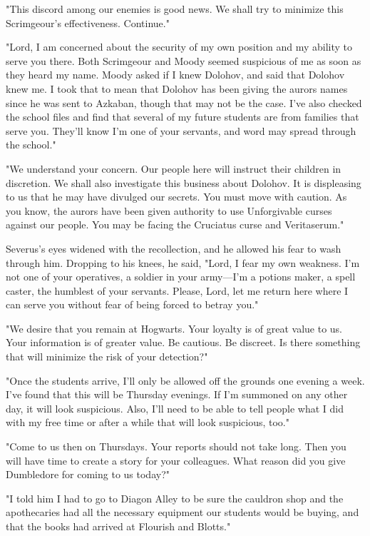 "This discord among our enemies is good news. We shall try to minimize this Scrimgeour's effectiveness. Continue."

"Lord, I am concerned about the security of my own position and my ability to serve you there. Both Scrimgeour and Moody seemed suspicious of me as soon as they heard my name. Moody asked if I knew Dolohov, and said that Dolohov knew me. I took that to mean that Dolohov has been giving the aurors names since he was sent to Azkaban, though that may not be the case. I've also checked the school files and find that several of my future students are from families that serve you. They'll know I'm one of your servants, and word may spread through the school."

"We understand your concern. Our people here will instruct their children in discretion. We shall also investigate this business about Dolohov. It is displeasing to us that he may have divulged our secrets. You must move with caution. As you know, the aurors have been given authority to use Unforgivable curses against our people. You may be facing the Cruciatus curse and Veritaserum."

Severus's eyes widened with the recollection, and he allowed his fear to wash through him. Dropping to his knees, he said, "Lord, I fear my own weakness. I'm not one of your operatives, a soldier in your army—I'm a potions maker, a spell caster, the humblest of your servants. Please, Lord, let me return here where I can serve you without fear of being forced to betray you."

"We desire that you remain at Hogwarts. Your loyalty is of great value to us. Your information is of greater value. Be cautious. Be discreet. Is there something that will minimize the risk of your detection?"

"Once the students arrive, I'll only be allowed off the grounds one evening a week. I've found that this will be Thursday evenings. If I'm summoned on any other day, it will look suspicious. Also, I'll need to be able to tell people what I did with my free time or after a while that will look suspicious, too."

"Come to us then on Thursdays. Your reports should not take long. Then you will have time to create a story for your{\el} colleagues. What reason did you give Dumbledore for coming to us today?"

"I told him I had to go to Diagon Alley to be sure the cauldron shop and the apothecaries had all the necessary equipment our students would be buying, and that the books had arrived at Flourish and Blotts."

